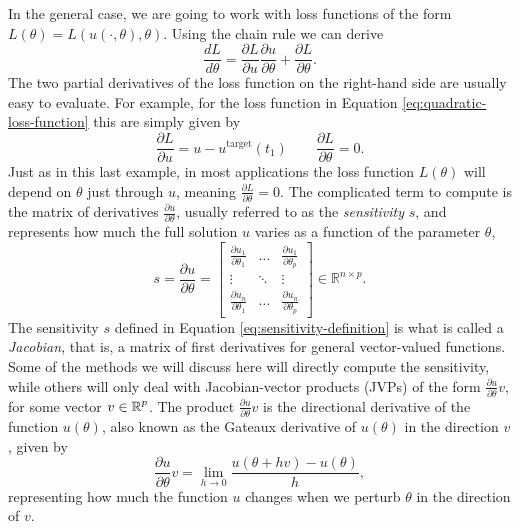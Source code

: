In the general case, we are going to work with loss functions of the form $L(\theta) = L(u(\cdot, \theta), \theta)$. 
Using the chain rule we can derive 
\begin{equation} 
 \frac{dL}{d\theta} = \frac{\partial L}{\partial u} \frac{\partial u}{\partial \theta} + \frac{\partial L}{\partial \theta}.
 \label{eq:dLdtheta_VJP}
\end{equation} 
The two partial derivatives of the loss function on the right-hand side are usually easy to evaluate.
For example, for the loss function in Equation \eqref{eq:quadratic-loss-function} this are simply given by 
\begin{equation}
    \frac{\partial L}{\partial u} = u - u^{\text{target}}(t_1)
    \qquad 
    \frac{\partial L}{\partial \theta} = 0.
    \label{eq:dLdu}
\end{equation}
Just as in this last example, in most applications the loss function $L(\theta)$ will depend on $\theta$ just through $u$, meaning $\frac{\partial L}{\partial \theta} = 0$.
The complicated term to compute is the matrix of derivatives $\frac{\partial u}{\partial \theta}$, usually referred to as the \textit{sensitivity} $s$, and represents how much the full solution $u$ varies as a function of the parameter $\theta$, 
\begin{equation}
 s 
 = 
 \frac{\partial u}{\partial \theta} 
 =
 \begin{bmatrix}
   \frac{\partial u_1}{\partial \theta_1} & \dots & \frac{\partial u_1}{\partial \theta_p} \\
   \vdots & \ddots & \vdots \\
   \frac{\partial u_n}{\partial \theta_1} & \dots & \frac{\partial u_n}{\partial \theta_p}
 \end{bmatrix}
 \in \mathbb R^{n \times p}.
 \label{eq:sensitivity-definition}
\end{equation}
The sensitivity $s$ defined in Equation \eqref{eq:sensitivity-definition} is what is called a \textit{Jacobian}, that is, a matrix of first derivatives for general vector-valued functions.
Some of the methods we will discuss here will directly compute the sensitivity, while others will only deal with Jacobian-vector products (JVPs) of the form $\frac{\partial u}{\partial \theta} v$, for some vector $v \in \operatorname{\mathbb{R}}^p$. 
The product $\frac{\partial u}{\partial \theta}v$ is the directional derivative of the function $u(\theta)$, also known as the Gateaux derivative of $u(\theta)$ in the direction $v$, given by 
\begin{equation}
    \frac{\partial u}{\partial \theta} v 
    = 
    \lim_{h \rightarrow 0} \frac{u(\theta + h v) - u(\theta)}{h},
    \label{eq:directional-derivative}
\end{equation}
representing how much the function $u$ changes when we perturb $\theta$ in the direction of $v$. 

